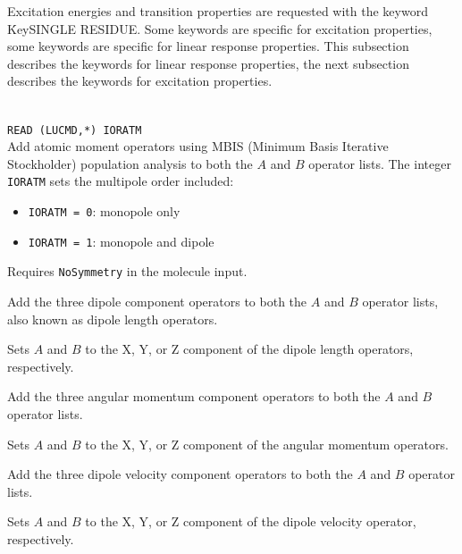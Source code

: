 Excitation energies and transition properties are requested with the keyword \.Key{SINGLE RESIDUE}.
Some keywords are specific for excitation properties,
some keywords are specific for linear response properties.
This subsection describes the keywords for linear response properties,
the next subsection describes the keywords for excitation properties.

\begin{description}

\item{}\\
\verb|READ (LUCMD,*) IORATM|\\
Add atomic moment operators using MBIS (Minimum Basis Iterative Stockholder) population analysis to both the $A$ and $B$ operator lists.
The integer \verb|IORATM| sets the multipole order included:
\begin{itemize}
  \item \verb|IORATM = 0|: monopole only
  \item \verb|IORATM = 1|: monopole and dipole 
\end{itemize}
Requires \verb|NoSymmetry| in the molecule input.

\item{}
Add the three dipole component operators to both the $A$ and $B$ operator lists, also known as dipole length operators.

\item{}
Sets $A$ and $B$ to the X, Y, or Z component of the dipole length operators, respectively.

\item{}
Add the three angular momentum component operators to both the $A$ and $B$ operator lists.

\item{}
Sets $A$ and $B$ to the X, Y, or Z component of the angular momentum operators.

\item{}
Add the three dipole velocity component operators to both the $A$ and $B$ operator lists.

\item{}
Sets $A$ and $B$ to the X, Y, or Z component of the dipole velocity
operator, respectively.


\end{description}
